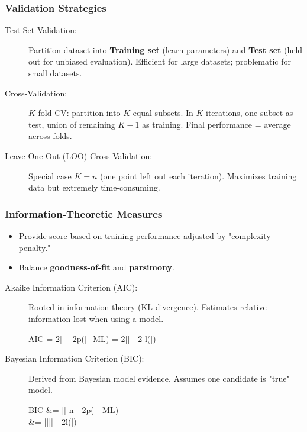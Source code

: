 \subsubsection*{Validation Strategies}

\begin{description}
    \item[Test Set Validation:] Partition dataset into \textbf{Training set} (learn parameters) and \textbf{Test set} (held out for unbiased evaluation). Efficient for large datasets; problematic for small datasets.
    \item[Cross-Validation:] $K$-fold CV: partition into $K$ equal subsets. In $K$ iterations, one subset as test, union of remaining $K-1$ as training. Final performance = average across folds.
    \item[Leave-One-Out (LOO) Cross-Validation:] Special case $K=n$ (one point left out each iteration). Maximizes training data but extremely time-consuming.
\end{description}

\subsubsection*{Information-Theoretic Measures}

\begin{itemize}
    \item Provide score based on training performance adjusted by "complexity penalty."
    \item Balance \textbf{goodness-of-fit} and \textbf{parsimony}.
\end{itemize}

\begin{description}
    \item[Akaike Information Criterion (AIC):] Rooted in information theory (KL divergence). Estimates relative information lost when using a model.
    \begin{myequation}
    AIC = 2|\Vtheta| - 2\log p(\X|\Vtheta_{ML}) = 2|\Vtheta| - 2\max{\Vtheta} l(\Vtheta|\X)
    \end{myequation}
    \item[Bayesian Information Criterion (BIC):] Derived from Bayesian model evidence. Assumes one candidate is "true" model.
    \begin{myalign}
    BIC &= |\Vtheta| \log n - 2\log p(\X|\Vtheta_{ML}) \\
    &= |\Vtheta|\log |\X| - 2\max{\Vtheta}l(\Vtheta|\X)
    \end{myalign}
\end{description}

